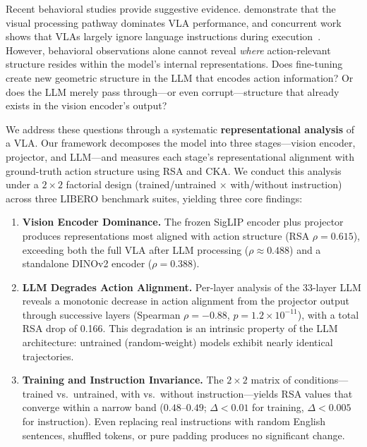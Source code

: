 \documentclass[10pt,letterpaper]{article}
\begin{document}
Recent behavioral studies provide suggestive evidence.
\citet{grant2026} demonstrate that the visual processing pathway dominates VLA performance, and concurrent work shows that VLAs largely ignore language instructions during execution~\citep{hou2026langgap, fei2025liberoplus}.
However, behavioral observations alone cannot reveal \emph{where} action-relevant structure resides within the model's internal representations.
Does fine-tuning create new geometric structure in the LLM that encodes action information?
Or does the LLM merely pass through---or even corrupt---structure that already exists in the vision encoder's output?

We address these questions through a systematic \textbf{representational analysis} of a VLA.
Our framework decomposes the model into three stages---vision encoder, projector, and LLM---and measures each stage's representational alignment with ground-truth action structure using RSA and CKA.
We conduct this analysis under a $2{\times}2$ factorial design (trained/untrained $\times$ with/without instruction) across three LIBERO benchmark suites, yielding three core findings:

\begin{enumerate}[leftmargin=*,itemsep=2pt]
\item \textbf{Vision Encoder Dominance.}
The frozen SigLIP encoder plus projector produces representations most aligned with action structure (RSA $\rho{=}0.615$), exceeding both the full VLA after LLM processing ($\rho{\approx}0.488$) and a standalone DINOv2 encoder ($\rho{=}0.388$).

\item \textbf{LLM Degrades Action Alignment.}
Per-layer analysis of the 33-layer LLM reveals a monotonic decrease in action alignment from the projector output through successive layers (Spearman $\rho{=}{-}0.88$, $p{=}1.2{\times}10^{-11}$), with a total RSA drop of 0.166.
This degradation is an intrinsic property of the LLM architecture: untrained (random-weight) models exhibit nearly identical trajectories.

\item \textbf{Training and Instruction Invariance.}
The $2{\times}2$ matrix of conditions---trained vs.\ untrained, with vs.\ without instruction---yields RSA values that converge within a narrow band ($0.48$--$0.49$; $\Delta{<}0.01$ for training, $\Delta{<}0.005$ for instruction).
Even replacing real instructions with random English sentences, shuffled tokens, or pure padding produces no significant change.
\end{enumerate}
\end{document}

